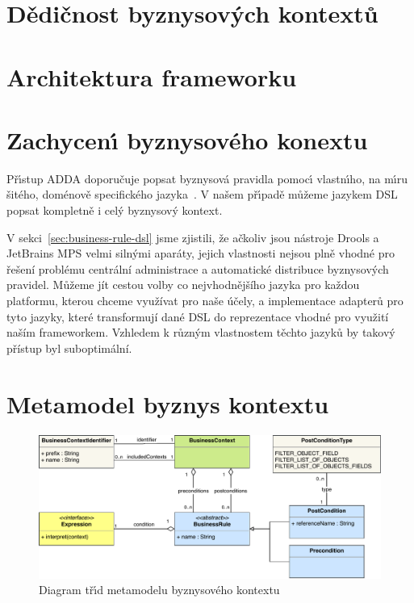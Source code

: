 \section{Dědičnost byznysových kontextů}

\section{Architektura frameworku}

\section{Zachycen\'{\i} byznysového konextu}

Př\'{\i}stup \gls{ADDA} doporučuje popsat byznysová pravidla pomoc\'{\i}
vlastn\'{\i}ho, na m\'{\i}ru šitého, doménově specifického jazyka~\cite{cemus2015automated}.
V našem př\'{\i}padě můžeme jazykem \gls{DSL} popsat kompletně i cel\'y
byznysov\'y kontext.

V sekci~\ref{sec:business-rule-dsl} jsme zjistili, že ačkoliv jsou nástroje Drools a JetBrains
MPS velmi silnými aparáty, jejich vlastnosti nejsou plně vhodné pro řešení problému
centrální administrace a automatické distribuce byznysových pravidel.
Můžeme jít cestou volby co nejvhodnějšího jazyka pro každou platformu, kterou chceme
využívat pro naše účely, a implementace adapterů pro tyto jazyky, které transformují
dané \gls{DSL} do reprezentace vhodné pro využití naším frameworkem. Vzhledem k
různým vlastnostem těchto jazyků by takový přístup byl suboptimální.

\section{Metamodel byznys kontextu}\label{sec:metamodel}

\begin{figure}
    \centering
    \includegraphics[keepaspectratio=true, width=\linewidth]{figures/business-context-metamodel.pdf}
    \caption{Diagram tř\'{\i}d metamodelu byznysového kontextu}
    \label{fig:business-context-metamodel}
\end{figure} %

